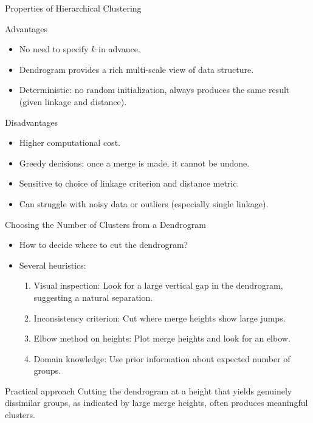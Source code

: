 \begin{frame}{Properties of Hierarchical Clustering}
  \begin{block}{Advantages}
    \begin{itemize}
      \item No need to specify $k$ in advance.
      \item Dendrogram provides a rich multi-scale view of data structure.
      \item Deterministic: no random initialization, always produces the same result
            (given linkage and distance).
    \end{itemize}
  \end{block}
  \begin{alertblock}{Disadvantages}
    \begin{itemize}
      \item Higher computational cost.
      \item Greedy decisions: once a merge is made, it cannot be undone.
      \item Sensitive to choice of linkage criterion and distance metric.
      \item Can struggle with noisy data or outliers (especially single linkage).
    \end{itemize}
  \end{alertblock}
\end{frame}

\begin{frame}{Choosing the Number of Clusters from a Dendrogram}
  \begin{itemize}
    \item How to decide where to cut the dendrogram?
    \item Several heuristics:
      \begin{enumerate}
        \item \alert{Visual inspection}: Look for a large vertical gap in the dendrogram,
              suggesting a natural separation.
        \item \alert{Inconsistency criterion}: Cut where merge heights show large jumps.
        \item \alert{Elbow method on heights}: Plot merge heights and look for an elbow.
        \item \alert{Domain knowledge}: Use prior information about expected number of groups.
      \end{enumerate}
  \end{itemize}
  \begin{block}{Practical approach}
    Cutting the dendrogram at a height that yields genuinely dissimilar groups, as
    indicated by large merge heights, often produces meaningful clusters.
  \end{block}
\end{frame}

